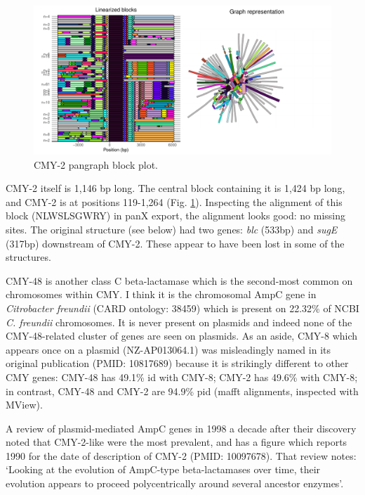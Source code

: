 \documentclass[aps,rmp,preprint,superscriptaddress,10pt,twocolumn]{revtex4-1}
\begin{document}
\begin{figure}
    \centering
    \includegraphics[width=0.8\linewidth]{figs/CMY-2-mmseqs2-polish.all_u5000_d5000_bandage_pangraph_blocks_plot.pdf}
    \caption{CMY-2 pangraph block plot.}
    \label{fig:CMY-2-pangraph-block-plot}
\end{figure}

CMY-2 itself is 1,146 bp long. The central block containing it is 1,424 bp long, and CMY-2 is at positions 119-1,264 (Fig. \ref{fig:CMY-2-pangraph-block-plot}). Inspecting the alignment of this block (NLWSLSGWRY) in panX export, the alignment looks good: no missing sites. The original structure (see below) had two genes: \textit{blc} (533bp) and \textit{sugE} (317bp) downstream of CMY-2. These appear to have been lost in some of the structures.

CMY-48 is another class C beta-lactamase which is the second-most common on chromosomes within CMY. I think it is the chromosomal AmpC gene in \textit{Citrobacter freundii} (CARD ontology: 38459) which is present on 22.32\% of NCBI \textit{C. freundii} chromosomes. It is never present on plasmids and indeed none of the CMY-48-related cluster of genes are seen on plasmids. As an aside, CMY-8 which appears once on a plasmid (NZ-AP013064.1) was misleadingly named in its original publication (PMID: 10817689) because it is strikingly different to other CMY genes: CMY-48 has 49.1\% id with CMY-8; CMY-2 has 49.6\% with CMY-8; in contrast, CMY-48 and CMY-2 are 94.9\% pid (mafft alignments, inspected with MView).

A review of plasmid-mediated AmpC genes in 1998 a decade after their discovery noted that CMY-2-like were the most prevalent, and has a figure which reports 1990 for the date of description of CMY-2 (PMID: 10097678). That review notes: `Looking at the evolution of AmpC-type beta-lactamases over time, their evolution appears to proceed polycentrically around several ancestor enzymes'. 
\end{document}
